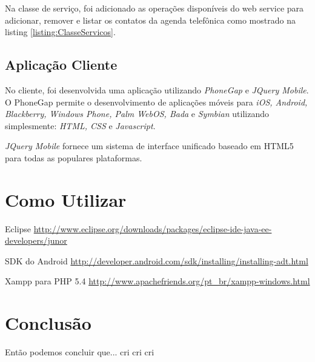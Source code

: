 \documentclass{acm_proc_article-sp}
\begin{document}
	
	
	Na classe de serviço, foi adicionado as operações disponíveis do web service para adicionar, remover e listar os contatos da agenda telefônica como mostrado na listing \ref{listing:ClasseServicos}.
	
	
	
	\subsection{Aplicação Cliente}
	
	No cliente, foi desenvolvida uma aplicação utilizando \emph{PhoneGap} e \emph{JQuery Mobile}. O PhoneGap permite o desenvolvimento de aplicações móveis para \emph{iOS, Android, Blackberry, Windows Phone, Palm WebOS, Bada} e \emph{Symbian} utilizando simplesmente: \emph{HTML, CSS} e \emph{Javascript}\cite{PHONEGAPSITE}.
	
	\emph{JQuery Mobile} fornece um sistema de interface unificado baseado em HTML5 para todas as populares plataformas.\cite{JQUERYMOBILESITE}
	
	
	
	

\section{Como Utilizar}
	
	Eclipse
	\url{http://www.eclipse.org/downloads/packages/eclipse-ide-java-ee-developers/junor}  
	
	SDK do Android 
	\url{http://developer.android.com/sdk/installing/installing-adt.html}
	 
	Xampp para PHP 5.4
	\url{ http://www.apachefriends.org/pt_br/xampp-windows.html}
	
	
\section{Conclusão}
	Então podemos concluir que... cri cri cri


\end{document}

